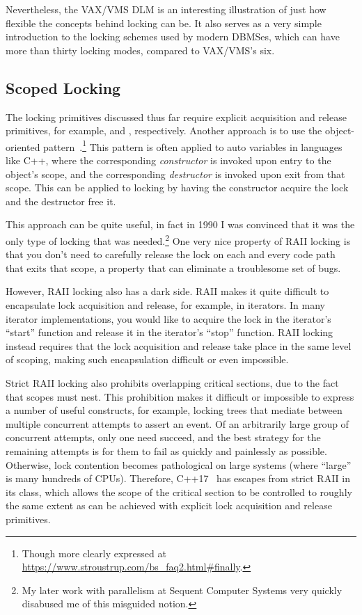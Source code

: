 Nevertheless, the VAX/VMS DLM is an interesting illustration of just
how flexible the concepts behind locking can be.
It also serves as a very simple introduction to the locking schemes
used by modern DBMSes, which can have more than thirty locking modes,
compared to VAX/VMS's six.

\subsection{Scoped Locking}
\label{sec:locking:Scoped Locking}

The locking primitives discussed thus far require explicit acquisition and
release primitives, for example,  and ,
respectively.
Another approach is to use the object-oriented 
pattern~\cite{MargaretAEllis1990Cplusplus}.\footnote{
	Though more clearly expressed at
	\url{https://www.stroustrup.com/bs_faq2.html\#finally}.}
This pattern is often applied to auto variables in languages like C++,
where the corresponding \emph{constructor} is invoked upon entry to
the object's scope, and the corresponding \emph{destructor} is invoked
upon exit from that scope.
This can be applied to locking by having the constructor acquire the
lock and the destructor free it.

This approach can be quite useful, in fact in 1990 I was convinced that it
was the only type of locking that was needed.\footnote{
	My later work with parallelism at Sequent Computer Systems very
	quickly disabused me of this misguided notion.}
One very nice property of RAII locking is that you don't need to carefully
release the lock on each and every code path that exits that scope,
a property that can eliminate a troublesome set of bugs.

However, RAII locking also has a dark side.
RAII makes it quite difficult to encapsulate lock acquisition and release,
for example, in iterators.
In many iterator implementations, you would like to acquire the lock in
the iterator's ``start'' function and release it in the iterator's ``stop''
function.
RAII locking instead requires that the lock acquisition and release take
place in the same level of scoping, making such encapsulation difficult or
even impossible.

Strict RAII locking also prohibits overlapping critical sections, due
to the fact that scopes must nest.
This prohibition makes it difficult or impossible to express a number of
useful constructs, for example, locking trees
that mediate between multiple concurrent attempts to assert an event.
Of an arbitrarily large group of concurrent attempts, only one need succeed,
and the best strategy for the remaining attempts is for them to fail as
quickly and painlessly as possible.
Otherwise, lock contention becomes pathological on large systems
(where ``large'' is many hundreds of CPUs).
Therefore, C++17~\cite{RichardSmith2019N4800} has escapes from strict RAII
in its  class, which allows the scope of the critical
section to be controlled to roughly the same extent as can be achieved
with explicit lock acquisition and release primitives.


